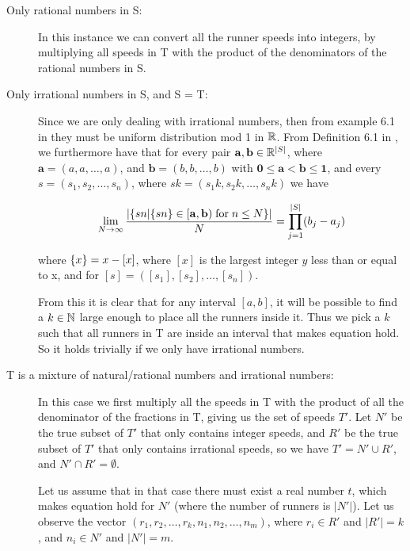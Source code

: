 \begin{description}
\item[Only rational numbers in S:] In this instance we can convert all the runner speeds into integers, by multiplying all speeds in T with the product of the denominators of the rational numbers in S.
\item[Only irrational numbers in S, and S = T:]
Since we are only dealing with irrational numbers, then from example 6.1 in \cite{uniform} they must be uniform distribution mod 1 in $\mathbb{R}$. 
From Definition 6.1 in \cite{uniform}, we furthermore have that for every pair $\mathbf{a}, \mathbf{b} \in \mathbb{R}^{|S|}$, where $\mathbf{a} = (a, a, \ldots, a)$, and $\mathbf{b} = (b, b, \ldots, b)$ with $\mathbf{0} \leq \mathbf{a} < \mathbf{b} \leq \mathbf{1}$, and every $s = (s_1, s_2, \ldots, s_n)$, where $sk = (s_1k, s_2k, \ldots, s_nk)$ we have

$$
\lim_{N \rightarrow \infty} \frac{
|\{
sn | \{sn\} \in [\mathbf{a}, \mathbf{b}) \;\mathrm{for}\;n \leq N
\}|
}{
N
} = 
\prod^{|S|}_{j=1}(b_j - a_j) 
$$

where $\{x\} = x - [x]$, where $[x]$ is the largest integer $y$ less than or equal to x, and for $[s] = ([s_1], [s_2], \ldots, [s_n])$.

From this it is clear that for any interval $[a, b]$, it will be possible to find a $k \in \mathbb{N}$ large enough to place all the runners inside it. Thus we pick a $k$ such that all runners in T are inside an interval that makes equation  hold. So it holds trivially if we only have irrational numbers.

\item[T is a mixture of natural/rational numbers and irrational numbers:]
In this case we first multiply all the speeds in T with the product of all the denominator of the fractions in T, giving us the set of speeds $T\prime$. Let $N\prime$ be the true subset of $T\prime$ that only contains integer speeds, and $R\prime$ be the true subset of $T\prime$ that only contains irrational speeds, so we have $T\prime = N\prime \cup R\prime$, and $N\prime \cap R\prime = \emptyset$.

Let us assume that in that case there must exist a real number $t$, which makes equation  hold for $N\prime$ (where the number of runners is $|N\prime|$). Let us observe the vector $(r_1, r_2, \ldots, r_k, n_1, n_2, \ldots, n_m)$, where $r_i \in R\prime$ and $|R\prime| = k$, and $n_i \in N\prime$ and $|N\prime| = m$. 


\end{description}

